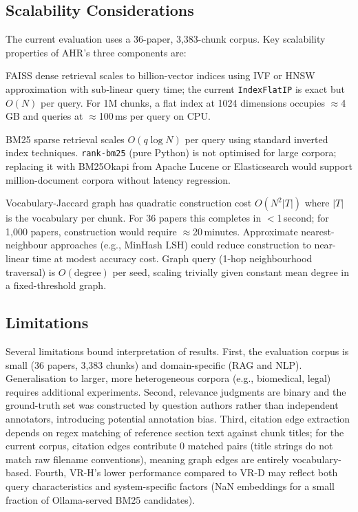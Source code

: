\documentclass[conference,10pt,twocolumn]{IEEEtran}
\begin{document}
\subsection{Scalability Considerations}

The current evaluation uses a 36-paper, 3,383-chunk corpus. Key scalability properties of AHR's three components are:

FAISS dense retrieval scales to billion-vector indices using IVF or HNSW approximation \cite{johnson2021faiss} with sub-linear query time; the current \texttt{IndexFlatIP} is exact but $O(N)$ per query. For 1M chunks, a flat index at 1024 dimensions occupies $\approx$4\,GB and queries at $\approx$100\,ms per query on CPU.

BM25 sparse retrieval scales $O(q\log N)$ per query using standard inverted index techniques. \texttt{rank-bm25} (pure Python) is not optimised for large corpora; replacing it with BM25Okapi from Apache Lucene or Elasticsearch would support million-document corpora without latency regression.

Vocabulary-Jaccard graph has quadratic construction cost $O(N^2|T|)$ where $|T|$ is the vocabulary per chunk. For 36 papers this completes in $<$1\,second; for 1,000 papers, construction would require $\approx$20\,minutes. Approximate nearest-neighbour approaches (e.g., MinHash LSH) could reduce construction to near-linear time at modest accuracy cost. Graph query (1-hop neighbourhood traversal) is $O(\mathrm{degree})$ per seed, scaling trivially given constant mean degree in a fixed-threshold graph.

\subsection{Limitations}

Several limitations bound interpretation of results. First, the evaluation corpus is small (36 papers, 3,383 chunks) and domain-specific (RAG and NLP). Generalisation to larger, more heterogeneous corpora (e.g., biomedical, legal) requires additional experiments. Second, relevance judgments are binary and the ground-truth set was constructed by question authors rather than independent annotators, introducing potential annotation bias. Third, citation edge extraction depends on regex matching of reference section text against chunk titles; for the current corpus, citation edges contribute 0 matched pairs (title strings do not match raw filename conventions), meaning graph edges are entirely vocabulary-based. Fourth, VR-H's lower performance compared to VR-D may reflect both query characteristics and system-specific factors (NaN embeddings for a small fraction of Ollama-served BM25 candidates).
\end{document}
